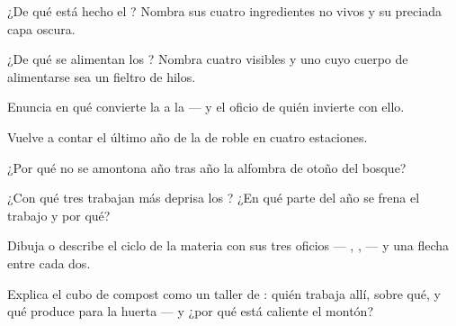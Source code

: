 \begin{exercise}[$\star$]\label{exo:g6:decomposers-and-soil:1}
¿De qué está hecho el ? Nombra sus cuatro ingredientes no vivos y
su preciada capa oscura.
\end{exercise}

\begin{exercise}[$\star$]\label{exo:g6:decomposers-and-soil:2}
¿De qué se alimentan los ? Nombra cuatro visibles y uno
cuyo cuerpo de alimentarse sea un fieltro de hilos.
\end{exercise}

\begin{exercise}[$\star$]\label{exo:g6:decomposers-and-soil:3}
Enuncia en qué convierte la  a la  --- y
el oficio de quién invierte con ello.
\end{exercise}

\begin{exercise}[$\star$]\label{exo:g6:decomposers-and-soil:4}
Vuelve a contar el último año de la  de roble en cuatro estaciones.
\end{exercise}

\begin{exercise}[$\star$]\label{exo:g6:decomposers-and-soil:5}
¿Por qué no se amontona año tras año la alfombra de otoño del bosque?
\end{exercise}

\begin{exercise}[$\star$]\label{exo:g6:decomposers-and-soil:6}
¿Con qué tres  trabajan más deprisa los ? ¿En
qué parte del año se frena el trabajo y por qué?
\end{exercise}

\begin{exercise}[$\star\star$]\label{exo:g6:decomposers-and-soil:7}
Dibuja o describe el ciclo de la materia con sus tres oficios ---
, ,  --- y una flecha entre cada
dos.
\end{exercise}

\begin{exercise}[$\star\star$]\label{exo:g6:decomposers-and-soil:8}
Explica el cubo de compost como un taller de : quién
trabaja allí, sobre qué, y qué produce para la huerta --- y ¿por qué
está caliente el montón?
\end{exercise}

